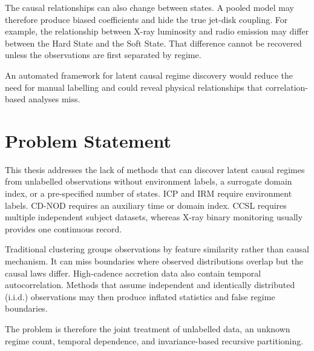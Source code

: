 The causal relationships can also change between states. A pooled model may therefore
produce biased coefficients and hide the true jet-disk coupling. For example, the
relationship between X-ray luminosity and radio emission may differ between the Hard
State and the Soft State. That difference cannot be recovered unless the observations
are first separated by regime.

An automated framework for latent causal regime discovery would reduce the need for
manual labelling and could reveal physical relationships that correlation-based
analyses miss.

\section{Problem Statement}
This thesis addresses the lack of methods that can discover latent causal regimes
from unlabelled observations without environment labels, a surrogate domain index,
or a pre-specified number of states. ICP \cite{peters2016causal} and IRM
\cite{arjovsky2019irm} require environment labels. CD-NOD \cite{huang2020causal}
requires an auxiliary time or domain index. CCSL requires multiple independent
subject datasets, whereas X-ray binary monitoring usually provides one continuous
record.

Traditional clustering groups observations by feature similarity rather than causal
mechanism. It can miss boundaries where observed distributions overlap but the causal
laws differ. High-cadence accretion data also contain temporal autocorrelation.
Methods that assume independent and identically distributed (i.i.d.) observations
may then produce inflated statistics and false regime boundaries.

The problem is therefore the joint treatment of unlabelled data, an unknown regime
count, temporal dependence, and invariance-based recursive partitioning.
